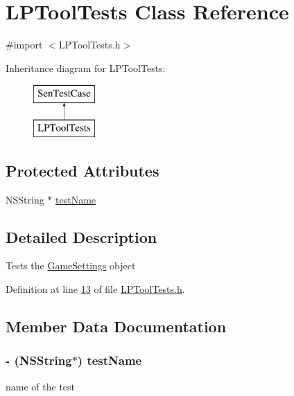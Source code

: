 \hypertarget{interface_l_p_tool_tests}{\section{L\-P\-Tool\-Tests Class Reference}
\label{d1/d2b/interface_l_p_tool_tests}
}


{\ttfamily \#import $<$L\-P\-Tool\-Tests.\-h$>$}

Inheritance diagram for L\-P\-Tool\-Tests\-:\begin{figure}[H]
\begin{center}
\leavevmode
\includegraphics[height=2.000000cm]{d1/d2b/interface_l_p_tool_tests}
\end{center}
\end{figure}
\subsection*{Protected Attributes}
\begin{DoxyCompactItemize}
\item 
N\-S\-String $\ast$ \hyperlink{interface_l_p_tool_tests_a3c6419a5af452250bc25319b2172b6cf}{test\-Name}
\end{DoxyCompactItemize}


\subsection{Detailed Description}
Tests the \hyperlink{interface_game_settings}{Game\-Settings} object 

Definition at line \hyperlink{_l_p_tool_tests_8h_source_l00013}{13} of file \hyperlink{_l_p_tool_tests_8h_source}{L\-P\-Tool\-Tests.\-h}.



\subsection{Member Data Documentation}
\hypertarget{interface_l_p_tool_tests_a3c6419a5af452250bc25319b2172b6cf}{
\subsubsection[{test\-Name}]{\setlength{\rightskip}{0pt plus 5cm}-\/ (N\-S\-String$\ast$) test\-Name\hspace{0.3cm}{\ttfamily [protected]}}}\label{d1/d2b/interface_l_p_tool_tests_a3c6419a5af452250bc25319b2172b6cf}
name of the test 


